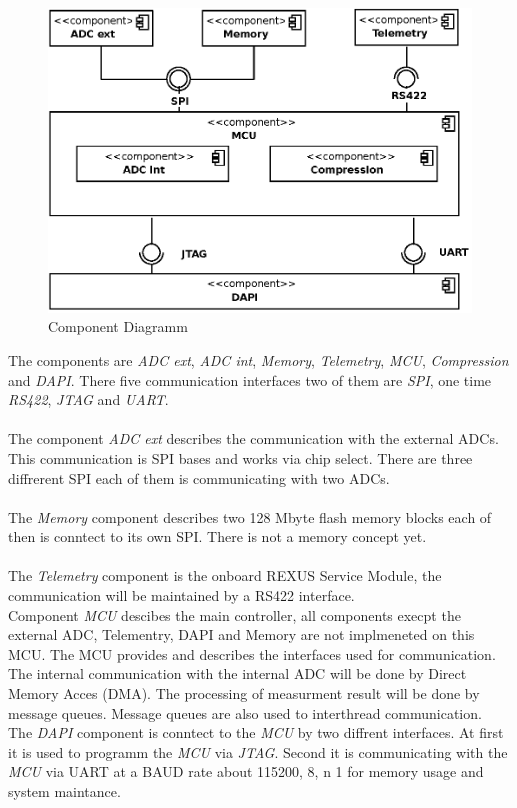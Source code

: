 \begin{figure}[htb]
	\centering
	\includegraphics{SoftwareDesign/Components.eps}
	\caption{Component Diagramm}
\end{figure} \noindent
The components are \textit{ADC ext}, \textit{ADC int}, \textit{Memory}, \textit{Telemetry}, \textit{MCU}, \textit{Compression} and \textit{DAPI}. There five communication interfaces two of them are \textit{SPI}, one time \textit{RS422}, \textit{JTAG} and \textit{UART}.\\ \\
The component \textit{ADC ext} describes the communication with the external ADCs. This communication is SPI bases and works via chip select. There are three diffrerent SPI each of them is communicating with two ADCs. \\ \\
The \textit{Memory} component  describes two 128 Mbyte flash memory blocks each of then  is conntect to its own SPI. There is not a memory concept yet. \\ \\
The \textit{Telemetry} component is the onboard REXUS Service Module, the communication will be maintained by a RS422 interface. \\ 
Component \textit{MCU} descibes the main controller, all components execpt the external ADC, Telementry, DAPI and Memory are not implmeneted on this MCU. The MCU provides and describes the interfaces used for communication. The internal communication with the internal ADC will be done by Direct Memory Acces (DMA). The processing of measurment result will be done by message queues. Message queues are also used to interthread communication. \\ 
The \textit{DAPI} component is conntect to the \textit{MCU} by two diffrent interfaces. At first it is used to programm the \textit{MCU} via \textit{JTAG}. Second it is communicating with the \textit{MCU} via UART at a BAUD rate about 115200, 8, n 1 for memory usage and system maintance. 